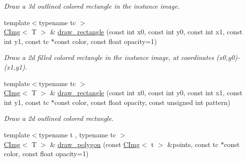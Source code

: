 \begin{DoxyCompactItemize}
\begin{DoxyCompactList}\small\item\em Draw a 3d outlined colored rectangle in the instance image. \item\end{DoxyCompactList}\item 
{\footnotesize template$<$typename tc $>$ }\\\hyperlink{structcimg__library_1_1CImg}{CImg}$<$ T $>$ \& \hyperlink{structcimg__library_1_1CImg_a08ff5543ae717bdbc4ccda3ca9d463ee}{draw\_\-rectangle} (const int x0, const int y0, const int x1, const int y1, const tc $\ast$const color, const float opacity=1)
\begin{DoxyCompactList}\small\item\em Draw a 2d filled colored rectangle in the instance image, at coordinates ({\ttfamily x0},{\ttfamily y0})-\/({\ttfamily x1},{\ttfamily y1}). \item\end{DoxyCompactList}\item 
\hypertarget{structcimg__library_1_1CImg_a88b4db9fc3ebcc8bd5134042424f3b8b}{
{\footnotesize template$<$typename tc $>$ }\\\hyperlink{structcimg__library_1_1CImg}{CImg}$<$ T $>$ \& \hyperlink{structcimg__library_1_1CImg_a88b4db9fc3ebcc8bd5134042424f3b8b}{draw\_\-rectangle} (const int x0, const int y0, const int x1, const int y1, const tc $\ast$const color, const float opacity, const unsigned int pattern)}
\label{structcimg__library_1_1CImg_a88b4db9fc3ebcc8bd5134042424f3b8b}

\begin{DoxyCompactList}\small\item\em Draw a 2d outlined colored rectangle. \item\end{DoxyCompactList}\item 
\hypertarget{structcimg__library_1_1CImg_a6e7c38c9a71a887da0bc3e4f0c4fdd40}{
{\footnotesize template$<$typename t , typename tc $>$ }\\\hyperlink{structcimg__library_1_1CImg}{CImg}$<$ T $>$ \& \hyperlink{structcimg__library_1_1CImg_a6e7c38c9a71a887da0bc3e4f0c4fdd40}{draw\_\-polygon} (const \hyperlink{structcimg__library_1_1CImg}{CImg}$<$ t $>$ \&points, const tc $\ast$const color, const float opacity=1)}
\label{structcimg__library_1_1CImg_a6e7c38c9a71a887da0bc3e4f0c4fdd40}


\end{DoxyCompactItemize}
